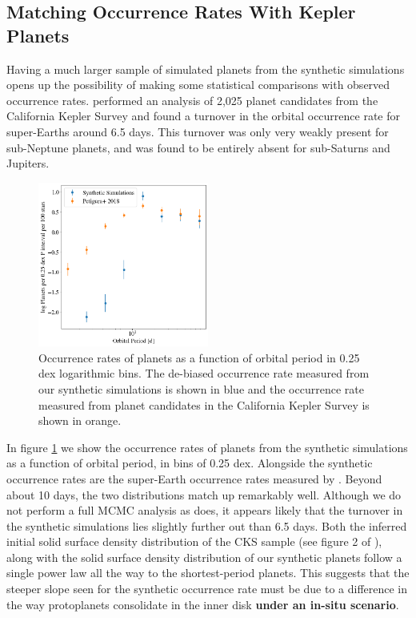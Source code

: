 \subsection{Matching Occurrence Rates With Kepler Planets}

Having a much larger sample of simulated planets from the synthetic simulations opens up the possibility of making some statistical comparisons with observed occurrence rates. \cite{petigura18} performed an analysis of 2,025 planet candidates from the California Kepler Survey and found a turnover in the orbital occurrence rate for super-Earths around 6.5 days. This turnover was only very weakly present for sub-Neptune planets, and was found to be entirely absent for sub-Saturns and Jupiters.

\begin{figure}
\begin{center}
    \includegraphics[width=0.5\textwidth]{figures/stip/occurrence_syn.png}
    \caption{Occurrence rates of planets as a function of orbital period in 0.25 dex logarithmic bins. The de-biased occurrence rate measured from our synthetic simulations is shown in blue and the occurrence rate measured from planet candidates in the California Kepler Survey \cite{petigura18} is shown in orange.\label{fig:occurrence_syn}}
\end{center}
\end{figure}

In figure \ref{fig:occurrence_syn} we show the occurrence rates of planets from the synthetic simulations as a function of orbital period, in bins of 0.25 dex. Alongside the synthetic occurrence rates are the super-Earth occurrence rates measured by \cite{petigura18}. Beyond about 10 days, the two distributions match up remarkably well. Although we do not perform a full MCMC analysis as \cite{petigura18} does, it appears likely that the turnover in the synthetic simulations lies slightly further out than 6.5 days. Both the inferred initial solid surface density distribution of the CKS sample (see figure 2 of \cite{dai20}), along with the solid surface density distribution of our synthetic planets follow a single power law all the way to the shortest-period planets. This suggests that the steeper slope seen for the synthetic occurrence rate must be due to a difference in the way protoplanets consolidate in the inner disk \textbf{under an in-situ scenario}. 

